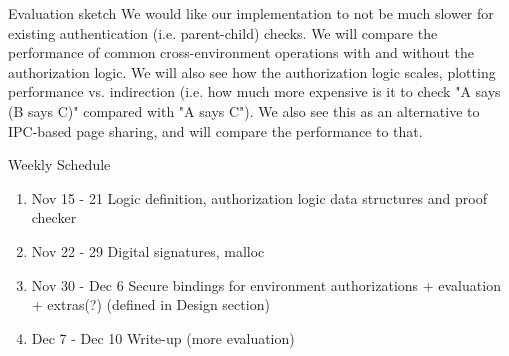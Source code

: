 \documentclass[10pt]{article}
\begin{document}
\begin{section}{Evaluation sketch}
We would like our implementation to not be much slower for existing authentication (i.e. parent-child) checks.  
We will compare the performance of common cross-environment operations with and without the authorization logic.  
We will also see how the authorization logic scales, plotting performance vs. indirection (i.e. how much more expensive is it to check "A says (B says C)" compared with "A says C").
We also see this as an alternative to IPC-based page sharing, and will compare the performance to that.
\end{section}

\begin{section}{Weekly Schedule}
\begin{enumerate}
\item Nov 15 - 21 Logic definition, authorization logic data structures and proof checker
\item Nov 22 - 29 Digital signatures, malloc
\item Nov 30 - Dec 6 Secure bindings for environment authorizations + evaluation + extras(?) (defined in Design section)
\item Dec 7 - Dec 10 Write-up (more evaluation)
\end{enumerate}
\end{section}
\end{document}
